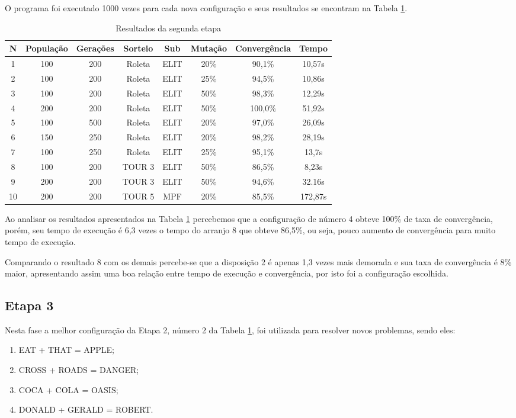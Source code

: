 \documentclass[a4paper, 12pt]{article}
\begin{document}
  O programa foi executado 1000 vezes para cada nova configuração
  e seus resultados se encontram na Tabela \ref{tab:etapa2}.

  \begin{table}[h]
    \centering
    \begin{tabular}{|c|c|c|c|c|c|c|c|}
      \hline
      N & População & Gerações & Sorteio & Sub & Mutação & Convergência & Tempo  \\
      \hline
      1 & 100 & 200 & Roleta & ELIT & 20\% & 90,1\% & 10,57s \\
      \hline
      2 & 100 & 200 & Roleta & ELIT & 25\% & 94,5\% & 10,86s \\
      \hline
      3 & 100 & 200 & Roleta & ELIT & 50\% & 98,3\% & 12,29s \\
      \hline
      4 & 200 & 200 & Roleta & ELIT & 50\% & 100,0\% & 51,92s \\
      \hline
      5 & 100 & 500 & Roleta & ELIT & 20\% & 97,0\% & 26,09s \\
      \hline
      6 & 150 & 250 & Roleta & ELIT & 20\% & 98,2\% & 28,19s \\
      \hline
      7 & 100 & 250 & Roleta & ELIT & 25\% & 95,1\% & 13,7s \\
      \hline
      8 & 100 & 200 & TOUR 3 & ELIT & 50\% & 86,5\% & 8,23s \\
      \hline
      9 & 200 & 200 & TOUR 3 & ELIT & 50\% & 94,6\% & 32.16s \\
      \hline
      10 & 200 & 200 & TOUR 5 & MPF & 20\% & 85,5\% & 172,87s \\
      \hline
    \end{tabular}
    \caption{Resultados da segunda etapa}
    \label{tab:etapa2}
  \end{table}

  Ao analisar os resultados apresentados na Tabela \ref{tab:etapa2} percebemos
  que a configuração de número 4 obteve 100\% de taxa de convergência, porém,
  seu tempo de execução é 6,3 vezes o tempo do arranjo 8 que obteve 86,5\%, ou seja,
  pouco aumento de convergência para muito tempo de execução.

  Comparando o resultado 8 com os demais percebe-se que a disposição 2 é apenas
  1,3 vezes mais demorada e sua taxa de convergência é 8\% maior, apresentando assim
  uma boa relação entre tempo de execução e convergência, por isto foi a configuração
  escolhida.
  \subsection{Etapa 3}
  Nesta fase a melhor configuração da Etapa 2, número 2 da Tabela \ref{tab:etapa2},
  foi utilizada para resolver novos problemas, sendo eles:
  \begin{enumerate}
  \item EAT + THAT = APPLE;
  \item CROSS + ROADS = DANGER;
  \item COCA + COLA = OASIS;
  \item DONALD + GERALD = ROBERT.
  \end{enumerate}
\end{document}
